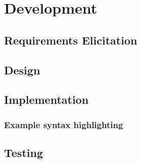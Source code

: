 \chapter{Development}


\section{Requirements Elicitation}
\section{Design}
\section{Implementation}
\subsection{Example syntax highlighting}



\section{Testing}
